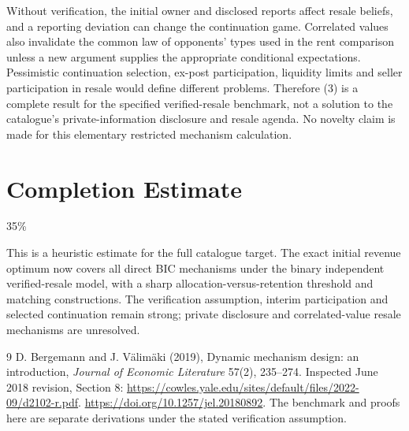 \documentclass[11pt]{article}
\theoremstyle{definition}
\theoremstyle{remark}
\begin{document}
Without verification, the initial owner and disclosed reports affect
resale beliefs, and a reporting deviation can change the continuation
game. Correlated values also invalidate the common law of opponents'
types used in the rent comparison unless a new argument supplies the
appropriate conditional expectations. Pessimistic continuation selection,
ex-post participation, liquidity limits and seller participation in resale
would define different problems. Therefore (3) is a complete result for
the specified verified-resale benchmark, not a solution to the catalogue's
private-information disclosure and resale agenda. No novelty claim is
made for this elementary restricted mechanism calculation.

\section{Completion Estimate}
35\%

This is a heuristic estimate for the full catalogue target.
The exact initial revenue optimum now covers all direct BIC mechanisms
under the binary independent verified-resale model, with a sharp
allocation-versus-retention threshold and matching constructions.
The verification assumption, interim participation and selected
continuation remain strong; private disclosure and correlated-value
resale mechanisms are unresolved.

\begin{thebibliography}{9}
 D. Bergemann and J. V\"alim\"aki (2019), Dynamic mechanism design: an introduction, \emph{Journal of Economic Literature} 57(2), 235--274. Inspected June 2018 revision, Section 8: \url{https://cowles.yale.edu/sites/default/files/2022-09/d2102-r.pdf}. \url{https://doi.org/10.1257/jel.20180892}. The benchmark and proofs here are separate derivations under the stated verification assumption.
\end{thebibliography}
\end{document}
